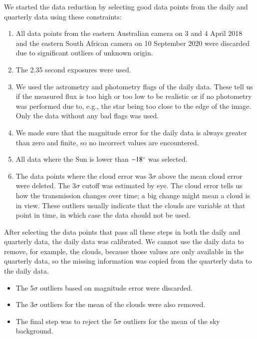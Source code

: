 \documentclass{aa}
\begin{document}
We started the data reduction by selecting good data points from the daily and quarterly data using these constraints:

\begin{enumerate}
    \item All data points from the eastern Australian camera on 3 and 4 April 2018 and the eastern South African camera on 10 September 2020 were discarded due to significant outliers of unknown origin.
    \item The 2.35 second exposures were used.
    \item We used the astrometry and photometry flags of the daily data. 
    These tell us if the measured flux is too high or too low to be realistic or if no photometry was performed due to, e.g., the star being too close to the edge of the image.
    Only the data without any bad flags was used. 
    \item We made sure that the magnitude error for the daily data is always greater than zero and finite, so no incorrect values are encountered. 
    \item All data where the Sun is lower than $-18^\circ$ was selected. %
    \item The data points where the cloud error was 3$\sigma$ above the mean cloud error were deleted.
    The 3$\sigma$ cutoff was estimated by eye.
    The cloud error tells us how the transmission changes over time; a big change might mean a cloud is in view.
    These outliers usually indicate that the clouds are variable at that point in time, in which case the data should not be used.
\end{enumerate}

After selecting the data points that pass all these steps in both the daily and quarterly data, the daily data was calibrated.
%
We cannot use the daily data to remove, for example, the clouds, because those values are only available in the quarterly data, so the missing information was copied from the quarterly data to the daily data. 

\begin{itemize}
    \item The 5$\sigma$ outliers based on magnitude error were discarded. %
    \item The 3$\sigma$ outliers for the mean of the clouds were also removed. %
    \item The final step was to reject the 5$\sigma$ outliers for the mean of the sky background. %
\end{itemize}
\end{document}

